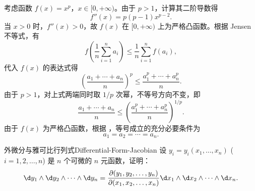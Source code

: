 \begin{myproof}
    考虑函数 $f(x) = x^p$，$x \in [0, +\infty)$。由于 $p > 1$，计算其二阶导数得
    \begin{equation}
        f''(x) = p(p-1)x^{p-2}. \label{eq:second-derivative}
    \end{equation}
    当 $x > 0$ 时，$f''(x) > 0$，故 $f(x)$ 在 $[0, +\infty)$ 上为严格凸函数。根据 Jensen 不等式，有
    \begin{equation}
        f\left( \frac{1}{n} \sum_{i=1}^{n} a_i \right) \le \frac{1}{n} \sum_{i=1}^{n} f(a_i), \label{eq:jensen-apply}
    \end{equation}
    代入 $f(x)$ 的表达式得
    \begin{equation}
        \left( \frac{a_1 + \cdots + a_n}{n} \right)^p \le \frac{a_1^p + \cdots + a_n^p}{n}.
    \end{equation}
    由于 $p > 1$，对上式两端同时取 $1/p$ 次幂，不等号方向不变，即
    \begin{equation}
        \frac{a_1 + \cdots + a_n}{n} \le \left( \frac{a_1^p + \cdots + a_n^p}{n} \right)^{1/p}.
    \end{equation}
    由于 $f(x)$ 为严格凸函数，根据 ，等号成立的充分必要条件为
    \begin{equation}
        \boxed{a_1 = a_2 = \cdots = a_n.}
    \end{equation}
\end{myproof}


\begin{problem}{外微分与雅可比行列式}{Differential-Form-Jacobian}
    设 $y_i = y_i(x_1, \dots, x_n)$ ($i = 1, 2, \dots, n$) 是 $n$ 个可微的 $n$ 元函数，证明：
    \begin{equation}
        \d y_1 \wedge \d y_2 \wedge \dots \wedge \d y_n = \frac{\partial(y_1, y_2, \dots, y_n)}{\partial(x_1, x_2, \dots, x_n)} \d x_1 \wedge \d x_2 \wedge \dots \wedge \d x_n.
    \end{equation}
\end{problem}

